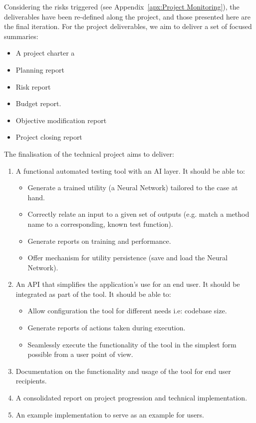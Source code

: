 \documentclass[a4paper, 11pt]{report}
\begin{document}
Considering the risks triggered (see Appendix~\ref{apx:Project Monitoring}), the deliverables have been re-defined along the project, and those presented here are the final iteration.
For the project deliverables, we aim to deliver a set of focused summaries:
\begin{itemize}
    \item A project charter a
    \item Planning report
    \item Risk report
    \item Budget report.
    \item Objective modification report
    \item Project closing report
\end{itemize}
The finalisation of the technical project aims to deliver:
\begin{enumerate}
    \item A functional automated testing tool with an AI layer. It should be able to:
    \begin{itemize}
        \item Generate a trained utility (a Neural Network) tailored to the case at hand.
        \item Correctly relate an input to a given set of outputs (e.g. match a method name to a corresponding, known test function).
        \item Generate reports on training and performance.
        \item Offer mechanism for utility persistence (save and load the Neural Network).
    \end{itemize}
    \item An API that simplifies the application's use for an end user. It should be integrated as part of the tool. It should be able to:
    \begin{itemize}
        \item Allow configuration the tool for different needs i.e: codebase size.
        \item Generate reports of actions taken during execution.
        \item Seamlessly execute the functionality of the tool in the simplest form possible from a user point of view.
    \end{itemize}
    \item Documentation on the functionality and usage of the tool for end user recipients.
    \item A consolidated report on project progression and technical implementation.
    \item An example implementation to serve as an example for users.
\end{enumerate}
\end{document}
